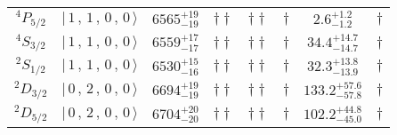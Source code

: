 \begin{tabular}{c| c c c c c c c}
$^{4}P_{5/2}$ & $\vert \,1\,,\,1\,,\,0\,,\,0 \,\rangle $ & $6565^{+19}_{-19}$ & $\dagger\dagger$ & $\dagger\dagger$ & $\dagger$ & $2.6^{+1.2}_{-1.2}$ & $\dagger$ \\ 
$^{4}S_{3/2}$ & $\vert \,1\,,\,1\,,\,0\,,\,0 \,\rangle $ & $6559^{+17}_{-17}$ & $\dagger\dagger$ & $\dagger\dagger$ & $\dagger$ & $34.4^{+14.7}_{-14.7}$ & $\dagger$ \\ 
$^{2}S_{1/2}$ & $\vert \,1\,,\,1\,,\,0\,,\,0 \,\rangle $ & $6530^{+15}_{-16}$ & $\dagger\dagger$ & $\dagger\dagger$ & $\dagger$ & $32.3^{+13.8}_{-13.9}$ & $\dagger$ \\ 
$^{2}D_{3/2}$ & $\vert \,0\,,\,2\,,\,0\,,\,0 \,\rangle $ & $6694^{+19}_{-19}$ & $\dagger\dagger$ & $\dagger\dagger$ & $\dagger$ & $133.2^{+57.6}_{-57.8}$ & $\dagger$ \\ 
$^{2}D_{5/2}$ & $\vert \,0\,,\,2\,,\,0\,,\,0 \,\rangle $ & $6704^{+20}_{-20}$ & $\dagger\dagger$ & $\dagger\dagger$ & $\dagger$ & $102.2^{+44.8}_{-45.0}$ & $\dagger$ \\ 
\hline \hline
\end{tabular}
